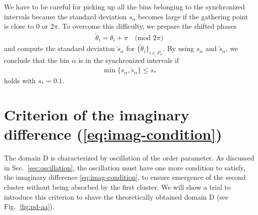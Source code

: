 We have to be careful for picking up all the bins
belonging to the synchronized intervals
because the standard deviation $s_{\alpha}$ becomes large
if the gathering point is close to $0$ or $2\pi$.
To overcome this difficulty, we prepare the shifted phases
\begin{align}
  \widetilde{\theta}_{i} = \theta_{i} + \pi \quad
  \text{(mod $2\pi$)}
\end{align}
and compute the standard deviation $\widetilde{s}_{\alpha}$ for
$\{\widetilde{\theta}_{i}\}_{i\in P_{\alpha}}$.
By using $s_{\alpha}$ and $\widetilde{s}_{\alpha}$,
we conclude that the bin $\alpha$ is in the synchronized intervals if
\begin{align}
  \min\{ s_{\alpha}, \widetilde{s}_{\alpha} \} \leq s_{\ast}
\end{align}
holds with $s_{\ast}=0.1$.

\section{Criterion of the imaginary difference (\ref{eq:imag-condition})}
\label{sec:imag-condition}

  The domain D is characterized by oscillation of the order parameter.
  As discussed in Sec.~\ref{sec:oscillation},
  the oscillation must have one more condition to satisfy,
  the imaginary difference \eqref{eq:imag-condition},
  to ensure emergence of the second cluster without being absorbed
  by the first cluster.
  We will show a trial to introduce this criterion
  to shave the theoretically obtained domain D
  (see Fig.~\ref{fig:pd-aa}).



